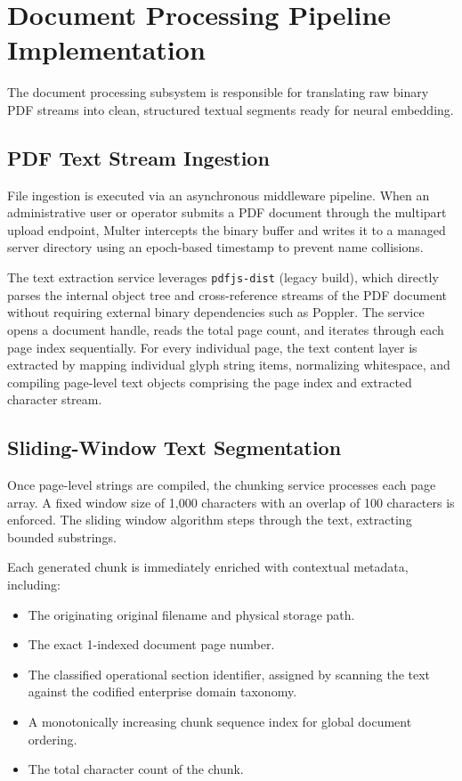 \section{Document Processing Pipeline Implementation}
\label{sec:impl_pdf_processing}

The document processing subsystem is responsible for translating raw binary PDF streams into clean, structured textual segments ready for neural embedding.

\subsection{PDF Text Stream Ingestion}
File ingestion is executed via an asynchronous middleware pipeline. When an administrative user or operator submits a PDF document through the multipart upload endpoint, Multer intercepts the binary buffer and writes it to a managed server directory using an epoch-based timestamp to prevent name collisions. 

The text extraction service leverages \texttt{pdfjs-dist} (legacy build), which directly parses the internal object tree and cross-reference streams of the PDF document without requiring external binary dependencies such as Poppler. The service opens a document handle, reads the total page count, and iterates through each page index sequentially. For every individual page, the text content layer is extracted by mapping individual glyph string items, normalizing whitespace, and compiling page-level text objects comprising the page index and extracted character stream.

\subsection{Sliding-Window Text Segmentation}
Once page-level strings are compiled, the chunking service processes each page array. A fixed window size of 1,000 characters with an overlap of 100 characters is enforced. The sliding window algorithm steps through the text, extracting bounded substrings. 

Each generated chunk is immediately enriched with contextual metadata, including:
\begin{itemize}
    \item The originating original filename and physical storage path.
    \item The exact 1-indexed document page number.
    \item The classified operational section identifier, assigned by scanning the text against the codified enterprise domain taxonomy.
    \item A monotonically increasing chunk sequence index for global document ordering.
    \item The total character count of the chunk.
\end{itemize}


